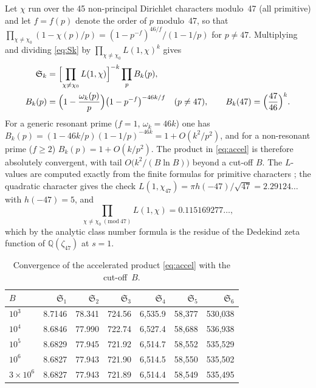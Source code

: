 ﻿\documentclass[11pt,a4paper]{article}
\newcommand{\Sk}[1]{\mathfrak{S}_{#1}}
\begin{document}
Let $\chi$ run over the 45 non-principal Dirichlet characters modulo~47 (all
primitive) and let $f = f(p)$ denote the order of $p$ modulo~47, so that
$\prod_{\chi \neq \chi_0}(1 - \chi(p)/p) = (1 - p^{-f})^{46/f}/(1 - 1/p)$ for
$p \neq 47$.  Multiplying and dividing \eqref{eq:Sk} by
$\prod_{\chi \ne \chi_0} L(1,\chi)^{k}$ gives
\begin{equation}\label{eq:accel}
\begin{aligned}
  \Sk{k} &= \Bigl[\prod_{\chi \neq \chi_0} L(1,\chi)\Bigr]^{-k}
           \prod_{p} B_k(p), \\
  B_k(p) &= \Bigl(1 - \frac{\omega_k(p)}{p}\Bigr)\bigl(1 - p^{-f}\bigr)^{-46k/f}
  \quad (p \ne 47), \qquad B_k(47) = \Bigl(\frac{47}{46}\Bigr)^{k}.
\end{aligned}
\end{equation}
For a generic resonant prime ($f = 1$, $\omega_k = 46k$) one has
$B_k(p) = (1 - 46k/p)(1 - 1/p)^{-46k} = 1 + O(k^2/p^2)$, and for a
non-resonant prime ($f \geq 2$) $B_k(p) = 1 + O(k/p^2)$.  The product in
\eqref{eq:accel} is therefore absolutely convergent, with tail
$O\bigl(k^2/(B \ln B)\bigr)$ beyond a cut-off $B$.  The $L$-values are computed
exactly from the finite formulas for primitive characters
\cite[Thm.~4.9]{Washington1997}; the quadratic character gives the check
$L(1,\chi_{47}) = \pi h(-47)/\sqrt{47} = 2.29124\ldots$ with $h(-47) = 5$, and
\begin{equation}
  \prod_{\chi \neq \chi_0 \ (\mathrm{mod}\ 47)} L(1,\chi) = 0.115169277\ldots,
\end{equation}
which by the analytic class number formula is the residue of the Dedekind zeta
function of $\mathbb{Q}(\zeta_{47})$ at $s = 1$.

\begin{table}[H]
\centering
\caption{Convergence of the accelerated product \eqref{eq:accel} with the cut-off~$B$.}
\label{tab:accel}
\smallskip
\begin{tabular}{lrrrrrr}
\toprule
$B$ & $\Sk{1}$ & $\Sk{2}$ & $\Sk{3}$ & $\Sk{4}$ & $\Sk{5}$ & $\Sk{6}$ \\
\midrule
$10^3$ & 8.7146 & 78.341 & 724.56 & 6{,}535.9 & 58{,}377 & 530{,}038 \\
$10^4$ & 8.6846 & 77.990 & 722.74 & 6{,}527.4 & 58{,}688 & 536{,}938 \\
$10^5$ & 8.6829 & 77.945 & 721.92 & 6{,}514.7 & 58{,}552 & 535{,}529 \\
$10^6$ & 8.6827 & 77.943 & 721.90 & 6{,}514.5 & 58{,}550 & 535{,}502 \\
$3 \times 10^6$ & 8.6827 & 77.943 & 721.89 & 6{,}514.4 & 58{,}549 & 535{,}495 \\
\bottomrule
\end{tabular}
\end{table}
\end{document}

